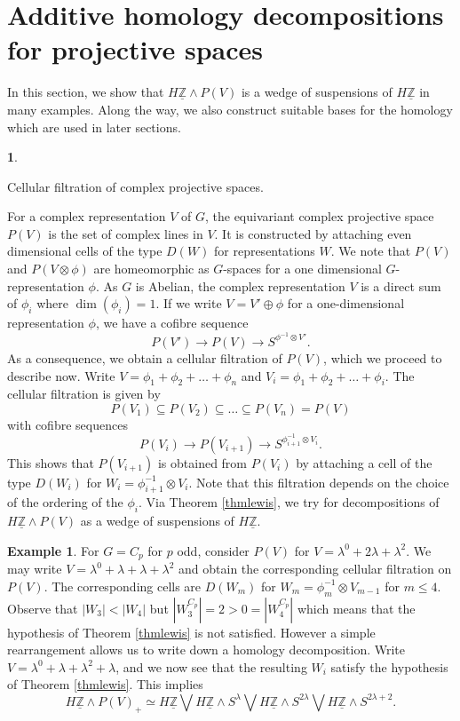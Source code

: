 \documentclass[a4paper,leqno,11pt]{amsart}
\theoremstyle{plain}
\theoremstyle{definition}
\newtheorem{exam}[theorem]{Example}
\newtheorem{subsec}[theorem]{}
\theoremstyle{remark}
\theoremstyle{definition}
\newcommand{\ra}{\rightarrow}
\newenvironment{mysubsection}[2][]
{\begin{subsec}\begin{upshape}\begin{bfseries}{#2.}
			\end{bfseries}{#1}}
		{\end{upshape}\end{subsec}}
\newcommand{\uZ}{\underline{\mathbb{Z}}}
\def\lam{\lambda}
\def\ra{\rightarrow}
\numberwithin{equation}{section}
\newcommand{\smas}{\wedge}
\begin{document}
	\section{Additive homology decompositions for projective spaces}\label{sec:additive}
	In this section,  we show that $H\uZ\smas P(V)$ is a wedge of suspensions of $H\uZ$ in many examples. Along the way, we also construct suitable bases for the homology which are used in later sections.
	\begin{mysubsection}{Cellular filtration of complex projective spaces}
		For a complex representation $V$ of $G$, the equivariant complex projective space $ P(V) $ is the set of complex lines in $V$. It is constructed by attaching even dimensional cells of the type $ D(W) $
		for representations $W$. We note that $P(V)$ and $P(V\otimes \phi)$ are homeomorphic as $G$-spaces for a one dimensional $G$-representation $\phi$. As $G$ is Abelian, the complex representation $V$ is a direct sum of $\phi_{i}$ where $\dim(\phi_{i})= 1$. If we write $V=V'\oplus\phi$ for a one-dimensional representation $\phi$, we have a cofibre sequence 
		$$P(V')\ra P(V)\ra S^{\phi^{-1}\otimes V'}.$$
		As a consequence, we obtain a cellular filtration of $P(V)$, which we proceed to describe now. Write $V=\phi_{1}+\phi_{2}+\dots+\phi_{n}$ and $V_{i}= \phi_{1}+\phi_{2}+\dots+\phi_{i}$. The cellular filtration is given by $$P(V_{1})\subseteq P(V_{2})\subseteq \dots \subseteq P(V_{n})= P(V)$$ with cofibre sequences
		$$P(V_{i})\ra P(V_{i+1})\ra S^{\phi_{i+1}^{-1}\otimes V_{i}}.$$
		This shows that $P(V_{i+1})$ is obtained from $P(V_{i})$ by attaching a cell of the type $D(W_{i})$ for $ W_{i} = \phi^{-1}_{i+1}\otimes V_{i}$.
		Note that this filtration depends on the choice of the ordering of the $ \phi_i $.
Via Theorem \ref{thmlewis}, we try for decompositions of $H\uZ\smas P(V)$ as a wedge of suspensions of $H\uZ$. 
	\end{mysubsection}
	
	
	\begin{exam}
	For $G=C_p$ for $p$ odd, consider $P(V)$ for $V = \lambda^0 +2 \lambda + \lambda^2$. We may write $V=\lam^{0}+\lam + \lam + \lam^2$ and obtain the corresponding cellular filtration on $P(V)$. The corresponding cells are $D(W_{m})$ for $W_{m} = \phi_{m}^{-1}\otimes V_{m-1}$ for $m\leq 4$. Observe that $|W_3| < |W_4|$ but $|W_{3}^{C_p}| =2 > 0 = |W_{4}^{C_p}|$ which means that the hypothesis of Theorem \ref{thmlewis} is not satisfied. However a simple rearrangement allows us to write down a homology decomposition. Write $V= \lam^0 + \lam +\lam^2 +\lam$, and we now see that the resulting $W_{i}$ satisfy the hypothesis of Theorem \ref{thmlewis}. This implies 
		$$H\uZ\smas P(V)_+\simeq H\uZ\bigvee H\uZ\smas S^{\lambda}\bigvee H\uZ\smas S^{2\lambda}\bigvee H\uZ\smas S^{2\lambda + 2}.$$
	\end{exam}
	
\end{document}
